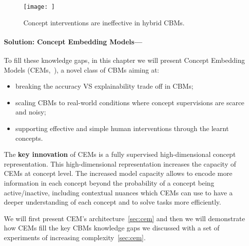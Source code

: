 \documentclass[withindex,glossary]{cam-thesis}
\theoremstyle{plain}
\theoremstyle{definition}
\theoremstyle{remark}
\begin{document}
\begin{figure}[h]
\texttt{[image: ]}
\caption{Concept interventions are ineffective in hybrid CBMs.}
\label{fig:hybrid_interventions}
\end{figure}

\paragraph{Solution: Concept Embedding Models---}
To fill these knowledge gaps, in this chapter we will present Concept Embedding Models (CEMs,~\citep{zarlenga2022concept}), a novel class of CBMs aiming at:
\begin{itemize}
	\item breaking the accuracy VS explainability trade off in CBMs;
	\item scaling CBMs to real-world conditions where concept supervisions are scarce and noisy;
	\item supporting effective and simple human interventions through the learnt concepts.
\end{itemize}
The \textbf{key innovation} of CEMs is a fully supervised high-dimensional concept representation. This high-dimensional representation increases the capacity of CEMs at concept level. The increased model capacity allows to encode more information in each concept beyond the probability of a concept being active/inactive, including contextual nuances which CEMs can use to have a deeper understanding of each concept and to solve tasks more efficiently.

We will first present CEM's architecture~\ref{sec:cem} and then we will demonstrate how CEMs fill the key CBMs knowledge gaps we discussed with a set of experiments of increasing complexity~\ref{sec:cem}.

%
%


%
%
\end{document}
